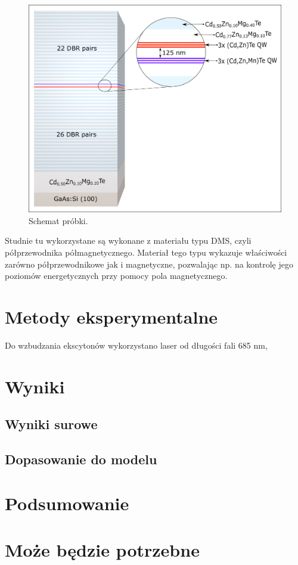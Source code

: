 \documentclass[licencjacka]{pracamgr}
\begin{document}
\begin{figure}[h!]
\includegraphics[width=13cm]{Probka} 
\centering
\caption{Schemat próbki.}
\end{figure}

Studnie tu wykorzystane są wykonane z materiału typu DMS, czyli półprzewodnika półmagnetycznego. Materiał tego typu wykazuje właściwości zarówno półprzewodnikowe jak i magnetyczne, pozwalając np. na kontrolę jego poziomów energetycznych przy pomocy pola magnetycznego.

\chapter{Metody eksperymentalne}\label{r:metody}
Do wzbudzania ekscytonów wykorzystano laser od długości fali 685 nm, 


\chapter{Wyniki}\label{r:wyniki}
\section{Wyniki surowe}
\section{Dopasowanie do modelu}




\chapter{Podsumowanie}


\appendix

\chapter{Może będzie potrzebne}



\end{document}
